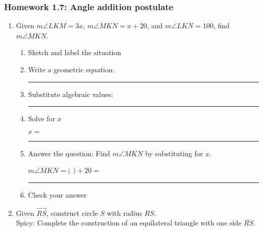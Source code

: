 \documentclass[12pt, oneside]{article}
\begin{document}
\newpage
\subsubsection*{Homework 1.7: Angle addition postulate}
  \begin{enumerate}
      \item Given $m\angle LKM = 3x$, $m\angle MKN = x+20$, and $m\angle LKN = 100$, find $m\angle MKN$.  \vspace{1cm}
      \begin{enumerate}
        \item Sketch and label the situation
        \begin{flushright}
        \end{flushright}
        \vspace{1cm}

        \item Write a geometric equation: \rule{5cm}{0.15mm} \vspace{1cm}
        \item Substitute algebraic values: \rule{5cm}{0.15mm}
        \item Solve for $x$
        \vspace{3cm}
        \begin{center} $x=$ \rule{1cm}{0.15mm} \end{center}
        \item Answer the question: Find $m\angle MKN$ by substituting for $x$.\\
        \begin{center} $m\angle MKN=($ \hspace{1cm} $)+20=$ \rule{1cm}{0.15mm} \end{center}
        \item Check your answer
      \end{enumerate}
      \vspace{2cm}

\newpage
  \item Given $\overrightarrow{RS}$, construct circle $S$ with radius $RS$.\\
  Spicy: Complete the construction of an equilateral triangle with one side $\overline{RS}$.


\end{enumerate}
\end{document}
